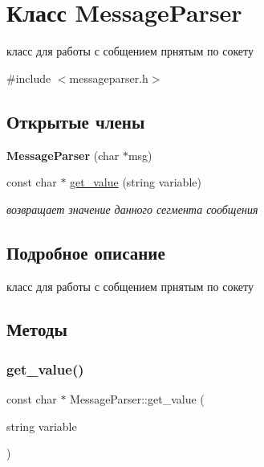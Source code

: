 \hypertarget{class_message_parser}{}\section{Класс Message\+Parser}
\label{class_message_parser}


класс для работы с собщением прнятым по сокету  




{\ttfamily \#include $<$messageparser.\+h$>$}

\subsection*{Открытые члены}
\begin{DoxyCompactItemize}
\item 
\mbox{\label{class_message_parser_a5cfefdc973c29e5e629ac56e71b75fab}} 
{\bfseries Message\+Parser} (char $\ast$msg)
\item 
const char $\ast$ \hyperlink{class_message_parser_a86adda183e66a075261f50f80f10d0e0}{get\+\_\+value} (string variable)
\begin{DoxyCompactList}\small\item\em возвращает значение данного сегмента сообщения \end{DoxyCompactList}\end{DoxyCompactItemize}


\subsection{Подробное описание}
класс для работы с собщением прнятым по сокету 

\subsection{Методы}
\mbox{\label{class_message_parser_a86adda183e66a075261f50f80f10d0e0}} 
\subsubsection{\texorpdfstring{get\+\_\+value()}{get\_value()}}
{\footnotesize\ttfamily const char $\ast$ Message\+Parser\+::get\+\_\+value (\begin{DoxyParamCaption}\item[{string}]{variable }\end{DoxyParamCaption})}



